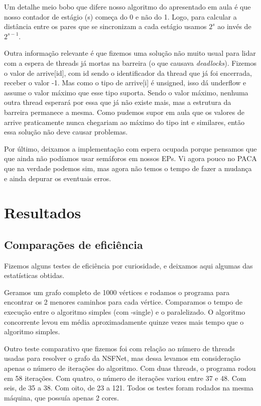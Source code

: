 \documentclass[a4paper,11pt]{article}
\begin{document}
    Um detalhe meio bobo que difere nosso algoritmo do apresentado em aula é que
    nosso contador de estágio (s) começa do 0 e não do 1. Logo, para calcular a
    distância entre os pares que se sincronizam a cada estágio usamos $2^s$ ao
    invés de $2^{s-1}$.

    Outra informação relevante é que fizemos uma solução não muito usual para
    lidar com a espera de threads já mortas na barreira (o que causava
    \textit{deadlocks}). Fizemos o valor de arrive[id], com id sendo o
    identificador da thread que já foi encerrada, receber o valor -1. Mas como
    o tipo de arrive[i] é unsigned, isso dá underflow e assume o valor máximo
    que esse tipo suporta. Sendo o valor máximo, nenhuma outra thread esperará
    por essa que já não existe mais, mas a estrutura da barreira permanece a
    mesma. Como pudemos supor em aula que os valores de arrive praticamente
    nunca chegariam ao máximo do tipo int e similares, então essa solução não
    deve causar problemas.

    Por último, deixamos a implementação com espera ocupada porque pensamos que
    que ainda não podíamos usar semáforos em nossos EPs. Vi agora pouco no PACA
    que na verdade podemos sim, mas agora não temos o tempo de fazer a mudança
    e ainda depurar os eventuais erros.

\section{Resultados}

  \subsection{Comparações de eficiência}
    Fizemos alguns testes de eficiência por curiosidade, e deixamos aqui
    algumas das estatísticas obtidas.

    Geramos um grafo completo de 1000 vértices e rodamos o programa para
    encontrar os 2 menores caminhos para cada vértice. Comparamos o tempo de
    execução entre o algoritmo simples (com -single) e o paralelizado. O
    algoritmo concorrente levou em média aproximadamente quinze vezes mais tempo
    que o algoritmo simples.

    Outro teste comparativo que fizemos foi com relação ao número de threads
    usadas para resolver o grafo da NSFNet, mas dessa levamos em consideração
    apenas o número de iterações do algoritmo. Com duas threads, o programa
    rodou em 58 iterações. Com quatro, o número de iterações variou entre 37 e
    48. Com seis, de 35 a 38. Com oito, de 23 a 121. Todos os testes foram
    rodados na mesma máquina, que possuía apenas 2 cores.
\end{document}
